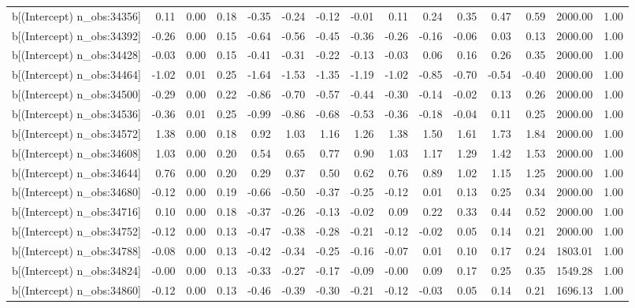 \begin{table}[ht]
\begin{tabular}{rrrrrrrrrrrrrrr}
  b[(Intercept) n\_obs:34356] & 0.11 & 0.00 & 0.18 & -0.35 & -0.24 & -0.12 & -0.01 & 0.11 & 0.24 & 0.35 & 0.47 & 0.59 & 2000.00 & 1.00 \\ 
  b[(Intercept) n\_obs:34392] & -0.26 & 0.00 & 0.15 & -0.64 & -0.56 & -0.45 & -0.36 & -0.26 & -0.16 & -0.06 & 0.03 & 0.13 & 2000.00 & 1.00 \\ 
  b[(Intercept) n\_obs:34428] & -0.03 & 0.00 & 0.15 & -0.41 & -0.31 & -0.22 & -0.13 & -0.03 & 0.06 & 0.16 & 0.26 & 0.35 & 2000.00 & 1.00 \\ 
  b[(Intercept) n\_obs:34464] & -1.02 & 0.01 & 0.25 & -1.64 & -1.53 & -1.35 & -1.19 & -1.02 & -0.85 & -0.70 & -0.54 & -0.40 & 2000.00 & 1.00 \\ 
  b[(Intercept) n\_obs:34500] & -0.29 & 0.00 & 0.22 & -0.86 & -0.70 & -0.57 & -0.44 & -0.30 & -0.14 & -0.02 & 0.13 & 0.26 & 2000.00 & 1.00 \\ 
  b[(Intercept) n\_obs:34536] & -0.36 & 0.01 & 0.25 & -0.99 & -0.86 & -0.68 & -0.53 & -0.36 & -0.18 & -0.04 & 0.11 & 0.25 & 2000.00 & 1.00 \\ 
  b[(Intercept) n\_obs:34572] & 1.38 & 0.00 & 0.18 & 0.92 & 1.03 & 1.16 & 1.26 & 1.38 & 1.50 & 1.61 & 1.73 & 1.84 & 2000.00 & 1.00 \\ 
  b[(Intercept) n\_obs:34608] & 1.03 & 0.00 & 0.20 & 0.54 & 0.65 & 0.77 & 0.90 & 1.03 & 1.17 & 1.29 & 1.42 & 1.53 & 2000.00 & 1.00 \\ 
  b[(Intercept) n\_obs:34644] & 0.76 & 0.00 & 0.20 & 0.29 & 0.37 & 0.50 & 0.62 & 0.76 & 0.89 & 1.02 & 1.15 & 1.25 & 2000.00 & 1.00 \\ 
  b[(Intercept) n\_obs:34680] & -0.12 & 0.00 & 0.19 & -0.66 & -0.50 & -0.37 & -0.25 & -0.12 & 0.01 & 0.13 & 0.25 & 0.34 & 2000.00 & 1.00 \\ 
  b[(Intercept) n\_obs:34716] & 0.10 & 0.00 & 0.18 & -0.37 & -0.26 & -0.13 & -0.02 & 0.09 & 0.22 & 0.33 & 0.44 & 0.52 & 2000.00 & 1.00 \\ 
  b[(Intercept) n\_obs:34752] & -0.12 & 0.00 & 0.13 & -0.47 & -0.38 & -0.28 & -0.21 & -0.12 & -0.02 & 0.05 & 0.14 & 0.21 & 2000.00 & 1.00 \\ 
  b[(Intercept) n\_obs:34788] & -0.08 & 0.00 & 0.13 & -0.42 & -0.34 & -0.25 & -0.16 & -0.07 & 0.01 & 0.10 & 0.17 & 0.24 & 1803.01 & 1.00 \\ 
  b[(Intercept) n\_obs:34824] & -0.00 & 0.00 & 0.13 & -0.33 & -0.27 & -0.17 & -0.09 & -0.00 & 0.09 & 0.17 & 0.25 & 0.35 & 1549.28 & 1.00 \\ 
  b[(Intercept) n\_obs:34860] & -0.12 & 0.00 & 0.13 & -0.46 & -0.39 & -0.30 & -0.21 & -0.12 & -0.03 & 0.05 & 0.14 & 0.21 & 1696.13 & 1.00 \\ 

\end{tabular}
\end{table}
